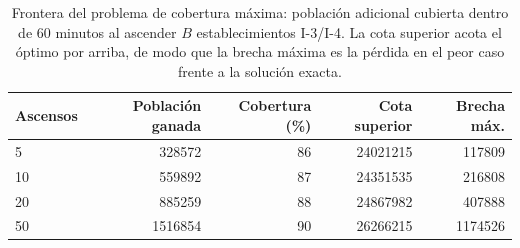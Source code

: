 \begin{table}[htbp]
\caption{Frontera del problema de cobertura máxima: población adicional cubierta dentro de 60 minutos al ascender $B$ establecimientos I-3/I-4. La cota superior acota el óptimo por arriba, de modo que la brecha máxima es la pérdida en el peor caso frente a la solución exacta.}
\label{tab:mclp}
\footnotesize
\begin{tabular}{lrrrr}
\toprule
Ascensos & Población ganada & Cobertura (\%) & Cota superior & Brecha máx. \\
\midrule
5 & 328572 & 86 & 24021215 & 117809 \\
10 & 559892 & 87 & 24351535 & 216808 \\
20 & 885259 & 88 & 24867982 & 407888 \\
50 & 1516854 & 90 & 26266215 & 1174526 \\
\bottomrule
\end{tabular}
\end{table}
